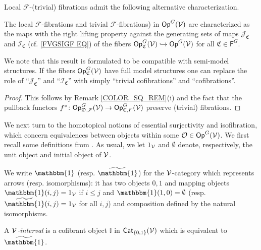 \documentclass[a4paper,10pt
,draft
]{article}%
\renewcommand{\F}{\mathcal F}
\newcommand{\I}{\mathbb I}
\renewcommand{\1}{\eta}%
\begin{document}
Local $\F$-(trivial) fibrations admit the following alternative characterization.

\begin{proposition}\label{LOCALTCHAR PROP}
The local $\F$-fibrations
and trivial $\F$-fibrations)
in $\mathsf{Op}^G(\mathcal V)$
are characterized as the maps with the right lifting property against the generating sets of maps 
$\mathcal{J}_{\mathfrak{C}}$ and $\mathcal{I}_{\mathfrak{C}}$
(cf. \eqref{FVGSIGF EQ})
of the fibers 
$\mathsf{Op}^G_{\mathfrak{C}}(\mathcal V) \hookrightarrow \mathsf{Op}^G(\mathcal V)$
for all $\mathfrak{C} \in \mathsf{F}^G$.
\end{proposition}

We note that this result is formulated to be compatible with semi-model structures.
If the fibers $\mathsf{Op}^G_{\mathfrak{C}}(\mathcal V)$ have full model structures one can replace the role of
``$\mathcal{J}_{\mathfrak{C}}$'' and ``$\mathcal{I}_{\mathfrak{C}}$''
with simply ``trivial cofibrations'' and ``cofibrations''.


\begin{proof}
This follows by Remark \ref{COLOR_SQ_REM}(i)
and the fact that the pullback functors
$f^{\**} \colon \mathsf{Op}^G_{\mathfrak{D},\F}(\V)
\to \mathsf{Op}^G_{\mathfrak{C},F}(\V)$
preserve (trivial) fibrations.
\end{proof}




We next turn to the homotopical notions of essential surjectivity and isofibration, which concern equivalences between objects within some 
$\mathcal{O} \in \mathsf{Op}^G(\mathcal V)$.
We first recall some definitions from \cite{BM13}.
As usual, we let $1_{\mathcal V}$ and $\emptyset$ denote, respectively, the unit object and initial object of $\mathcal V$.

\begin{notation}
We write $\mathbbm{1}$ (resp. $\widetilde{\mathbbm{1}}$)
for the $\mathcal V$-category which represents arrows (resp. isomorphisms):
it has two objects $0,1$
and mapping objects
$\mathbbm{1}(i,j)= 1_{\V}$
if $i \leq j$
and 
$\mathbbm{1}(1,0)= \emptyset$
(resp. $\widetilde{\mathbbm{1}}(i,j)= 1_{\V}$ for all $i,j$)
and composition defined by the natural isomorphisms.
\end{notation}


\begin{definition}
	A {\em $\mathcal V$-interval} is a cofibrant object $\I$ in $\mathsf{Cat}_{\left\{0,1\right\}}(\mathcal V)$
	which is equivalent to $\widetilde{\mathbbm{1}}$.
\end{definition}
\end{document}
